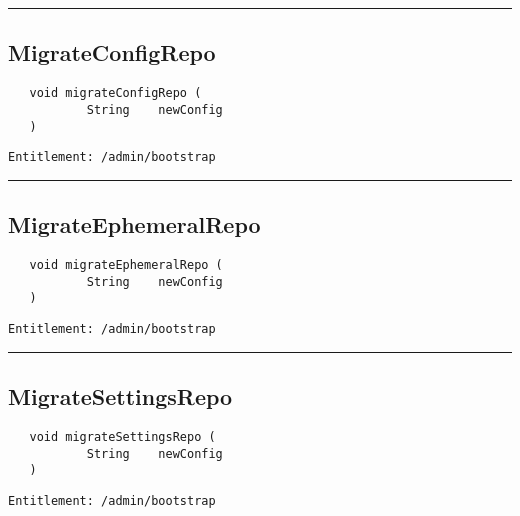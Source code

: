 \rule{12cm}{2pt}
\subsection{MigrateConfigRepo}
\label{Api:MigrateConfigRepo}
\begin{verbatim}
   void migrateConfigRepo (
           String    newConfig
   )
\end{verbatim}
\begin{Verbatim}[fontsize=\small, formatcom=\color{Maroon}]
  Entitlement: /admin/bootstrap
\end{Verbatim}



\rule{12cm}{2pt}
\subsection{MigrateEphemeralRepo}
\label{Api:MigrateEphemeralRepo}
\begin{verbatim}
   void migrateEphemeralRepo (
           String    newConfig
   )
\end{verbatim}
\begin{Verbatim}[fontsize=\small, formatcom=\color{Maroon}]
  Entitlement: /admin/bootstrap
\end{Verbatim}



\rule{12cm}{2pt}
\subsection{MigrateSettingsRepo}
\label{Api:MigrateSettingsRepo}
\begin{verbatim}
   void migrateSettingsRepo (
           String    newConfig
   )
\end{verbatim}
\begin{Verbatim}[fontsize=\small, formatcom=\color{Maroon}]
  Entitlement: /admin/bootstrap
\end{Verbatim}



